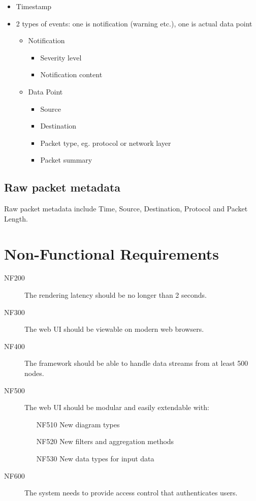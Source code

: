 \documentclass[twoside, english, draft]{Pflichtenheft}
\begin{document}
	\begin{itemize}
		\item Timestamp
		\item 2 types of events: one is notification (warning etc.), one is actual data point
			\begin{itemize}
				\item Notification
				\begin{itemize}
					\item Severity level
					\item Notification content
				\end{itemize}
				\item Data Point
				\begin{itemize}
					\item Source
					\item Destination
					\item Packet type, eg. protocol or network layer
					\item Packet summary
				\end{itemize}
			\end{itemize}
	\end{itemize}

\subsection{Raw packet metadata}
\begin{description}
    \item
	Raw packet metadata include Time, Source, Destination, Protocol and Packet Length.
\end{description}

\section{Non-Functional Requirements}

\begin{description}

  \item[NF200]
  The rendering latency should be no longer than 2 seconds.

  \item[NF300]
  The web UI should be viewable on modern web browsers.

  \item[NF400]
  The framework should be able to handle data streams from at least 500 nodes.

  \item[NF500]
	The web UI should be modular and easily extendable with:
	\begin{itemize}
		\item[NF510]{New diagram types}
		\item[NF520]{New filters and aggregation methods}
		\item[NF530]{New data types for input data}
	\end{itemize}

  \item[NF600]
  The system needs to provide access control that authenticates users.

	  
\end{description}
\end{document}
